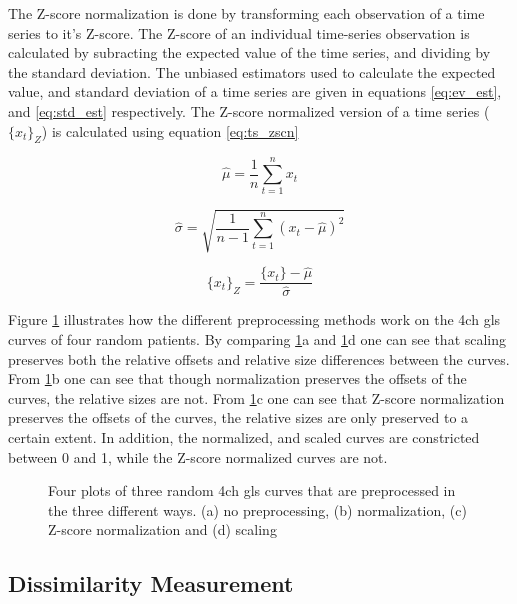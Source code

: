 The Z-score normalization is done by transforming each observation of a time series to it's Z-score. The Z-score of an individual time-series observation is calculated by subracting the expected value of the time series, and dividing by the standard deviation. The unbiased estimators used to calculate the expected value, and standard deviation of a time series are given in equations \eqref{eq:ev_est}, and \eqref{eq:std_est} respectively. The Z-score normalized version of a time series ($\{x_t\}_Z$) is calculated using equation \eqref{eq:ts_zscn}

\begin{equation}
    \hat{\mu} = \frac{1}{n} \sum^n_{t = 1} x_t
    \label{eq:ev_est}
\end{equation}

\begin{equation}
    \hat{\sigma} = \sqrt{\frac{1}{n - 1} \sum^n_{t = 1} (x_t - \hat{\mu})^2}
    \label{eq:std_est}
\end{equation}

\begin{equation}
    \{x_t\}_Z = \frac{\{x_t\} - \hat{\mu}}{\hat{\sigma}}
    \label{eq:ts_zscn}
\end{equation}

Figure \ref{fig:preproc} illustrates how the different preprocessing methods work on the \acrshort{4ch} \acrshort{gls} curves of four random patients. By comparing \ref{fig:preproc}a and \ref{fig:preproc}d one can see that scaling preserves both the relative offsets and relative size differences between the curves. From \ref{fig:preproc}b one can see that though normalization preserves the offsets of the curves, the relative sizes are not. From \ref{fig:preproc}c one can see that Z-score normalization preserves the offsets of the curves, the relative sizes are only preserved to a certain extent. In addition, the normalized, and scaled curves are constricted between 0 and 1, while the Z-score normalized curves are not.  

\begin{figure}
    \centering
    
    \caption{Four plots of three random \acrshort{4ch} \acrshort{gls} curves that are preprocessed in the three different ways. (a) no preprocessing, (b) normalization, (c) Z-score normalization and (d) scaling}
    \label{fig:preproc}
\end{figure}

\subsection{Dissimilarity Measurement}

